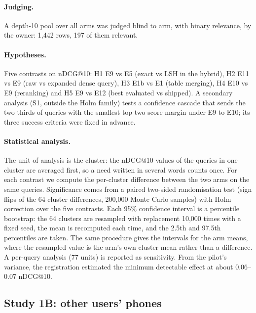 \documentclass[11pt,a4paper]{article}
\makeatletter
\newcommand{\ndcg}{nDCG@10}
\makeatother
\begin{document}
\paragraph{Judging.} A depth-10 pool over all arms was judged blind to arm, with binary relevance, by the owner: 1,442 rows, 197 of them relevant.

\paragraph{Hypotheses.} Five contrasts on \ndcg{}: H1 E9 vs E5 (exact vs LSH in the hybrid), H2 E11 vs E9 (raw vs expanded dense query), H3 E1b vs E1 (table merging), H4 E10 vs E9 (reranking) and H5 E9 vs E12 (best evaluated vs shipped). A secondary analysis (S1, outside the Holm family) tests a confidence cascade that sends the two-thirds of queries with the smallest top-two score margin under E9 to E10; its three success criteria were fixed in advance.

\paragraph{Statistical analysis.} The unit of analysis is the cluster: the \ndcg{} values of the queries in one cluster are averaged first, so a need written in several words counts once. For each contrast we compute the per-cluster difference between the two arms on the same queries. Significance comes from a paired two-sided randomisation test (sign flips of the 64 cluster differences, 200,000 Monte Carlo samples) with Holm correction over the five contrasts. Each 95\% confidence interval is a percentile bootstrap: the 64 clusters are resampled with replacement 10,000 times with a fixed seed, the mean is recomputed each time, and the 2.5th and 97.5th percentiles are taken. The same procedure gives the intervals for the arm means, where the resampled value is the arm's own cluster mean rather than a difference. A per-query analysis (77 units) is reported as sensitivity. From the pilot's variance, the registration estimated the minimum detectable effect at about 0.06--0.07 \ndcg{}.

\subsection{Study 1B: other users' phones}\label{sec:s1b}
\end{document}
